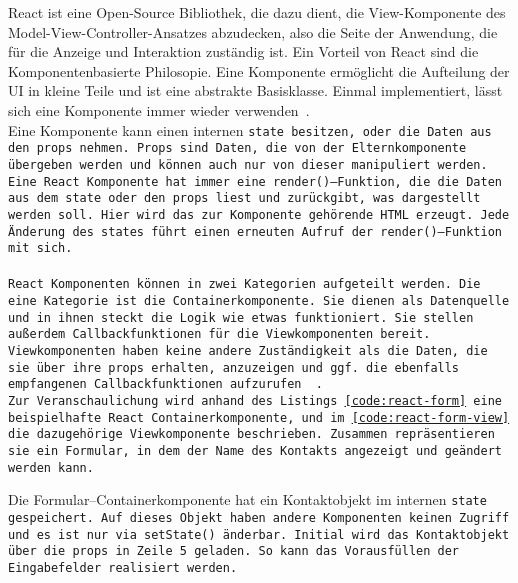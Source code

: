 React ist eine Open-Source Bibliothek, die dazu dient, die View-Komponente des Model-View-Controller-Ansatzes abzudecken, also die Seite der Anwendung, die für die Anzeige und Interaktion zuständig ist.
Ein Vorteil von React sind die Komponentenbasierte Philosopie. Eine Komponente ermöglicht die Aufteilung der \gls{UI} in kleine Teile und ist eine abstrakte Basisklasse. Einmal implementiert, lässt sich eine Komponente immer wieder verwenden~\cite{react}.\\
Eine Komponente kann einen internen \tt{state} besitzen, oder die Daten aus den \tt{props} nehmen.
\tt{Props} sind Daten, die von der Elternkomponente übergeben werden und können auch nur von dieser manipuliert werden.
Eine React Komponente hat immer eine \tt{render()}--Funktion, die die Daten aus dem \tt{state} oder den \tt{props} liest und zurückgibt, was dargestellt werden soll.
Hier wird das zur Komponente gehörende \gls{HTML} erzeugt. Jede Änderung des \tt{states} führt einen erneuten Aufruf der \tt{render()}--Funktion mit sich.\\\\
React Komponenten können in zwei Kategorien aufgeteilt werden.
Die eine Kategorie ist die Containerkomponente.
Sie dienen als Datenquelle und in ihnen steckt die Logik wie etwas funktioniert.
Sie stellen außerdem Callbackfunktionen für die Viewkomponenten bereit.
Viewkomponenten haben keine andere Zuständigkeit als die Daten, die sie über ihre \tt{props} erhalten, anzuzeigen und ggf. die ebenfalls empfangenen Callbackfunktionen aufzurufen ~\cite{react-components}.\\
Zur Veranschaulichung wird anhand des Listings \ref{code:react-form} eine beispielhafte React Containerkomponente, und im \autoref{code:react-form-view} die dazugehörige Viewkomponente beschrieben.
Zusammen repräsentieren sie ein Formular, in dem der Name des Kontakts angezeigt und geändert werden kann.
%
\begin{center}
  
\end{center}
%
Die Formular--Containerkomponente hat ein Kontaktobjekt im internen \tt{state} gespeichert.
Auf dieses Objekt haben andere Komponenten keinen Zugriff und es ist nur via \tt{setState()} änderbar.
Initial wird das Kontaktobjekt über die \tt{props} in Zeile 5 geladen. So kann das Vorausfüllen der Eingabefelder realisiert werden.\\

